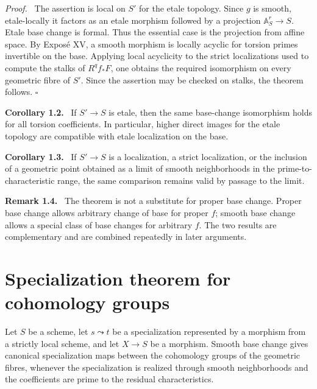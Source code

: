 \documentclass[12pt]{article}
\newcommand{\qedtext}{\hfill\(\square\)}
\newenvironment{statement}[1]{\par\medskip\noindent\textbf{#1.}\ }{\par\medskip}
\newenvironment{remarktext}[1]{\par\medskip\noindent\textbf{#1.}\ }{\par\medskip}
\newenvironment{prooftext}[1][Proof]{\par\noindent\emph{#1.}\ }{\par\medskip}
\begin{document}
\begin{prooftext}
The assertion is local on \(S'\) for the etale topology. Since \(g\) is smooth, etale-locally it factors as an etale morphism followed by a projection \(\mathbb A^r_S\to S\). Etale base change is formal. Thus the essential case is the projection from affine space. By Expos\'e XV, a smooth morphism is locally acyclic for torsion primes invertible on the base. Applying local acyclicity to the strict localizations used to compute the stalks of \(R^qf_*F\), one obtains the required isomorphism on every geometric fibre of \(S'\). Since the assertion may be checked on stalks, the theorem follows. \qedtext
\end{prooftext}

\begin{statement}{Corollary 1.2}
If \(S'\to S\) is etale, then the same base-change isomorphism holds for all torsion coefficients. In particular, higher direct images for the etale topology are compatible with etale localization on the base.
\end{statement}

\begin{statement}{Corollary 1.3}
If \(S'\to S\) is a localization, a strict localization, or the inclusion of a geometric point obtained as a limit of smooth neighborhoods in the prime-to-characteristic range, the same comparison remains valid by passage to the limit.
\end{statement}

\begin{remarktext}{Remark 1.4}
The theorem is not a substitute for proper base change. Proper base change allows arbitrary change of base for proper \(f\); smooth base change allows a special class of base changes for arbitrary \(f\). The two results are complementary and are combined repeatedly in later arguments.
\end{remarktext}

\section{Specialization theorem for cohomology groups}

Let \(S\) be a scheme, let \(s\leadsto t\) be a specialization represented by a morphism from a strictly local scheme, and let \(X\to S\) be a morphism. Smooth base change gives canonical specialization maps between the cohomology groups of the geometric fibres, whenever the specialization is realized through smooth neighborhoods and the coefficients are prime to the residual characteristics.
\end{document}

